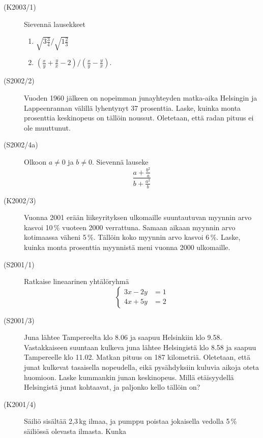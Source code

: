 \begin{description}
    \item[(K2003/1)]   Sievennä lausekkeet
        \begin{enumerate}
            \item $ \sqrt{3\frac{3}{4}} \big/ \sqrt{1\frac{2}{3}} $
            \item $ \left( \frac{x}{y} + \frac{y}{x} - 2 \right) \big/ \left( \frac{x}{y} - \frac{y}{x} \right) $.
        \end{enumerate}        
    \item[(S2002/2)]   Vuoden 1960 jälkeen on nopeimman junayhteyden matka-aika Helsingin ja Lappeenrannan välillä lyhentynyt
                       37 prosenttia. Laske, kuinka monta prosenttia keskinopeus on tällöin noussut. Oletetaan, että radan pituus ei
                       ole muuttunut.
    \item[(S2002/4a)]  Olkoon $ a \neq 0$ ja $b \neq 0 $. Sievennä lauseke
                       \[
                           \frac{a + \frac{b^2}{a} } {b + \frac{a^2}{b} }
                       \]
    \item[(K2002/3)]   Vuonna 2001 erään liikeyrityksen ulkomaille suuntautuvan myynnin arvo kasvoi 10\,\% vuoteen
                       2000 verrattuna. Samaan aikaan myynnin arvo kotimaassa väheni 5\,\%. Tällöin koko myynnin arvo kasvoi 6\,\%.
                       Laske, kuinka monta prosenttia myynnistä meni vuonna 2000 ulkomaille.
    \item[(S2001/1)]   Ratkaise lineaarinen yhtälöryhmä
                       \[
                         \left\{
                          \begin{matrix}
                             3x - 2y &= 1 \\
                             4x + 5y &= 2                      
                         \end{matrix}
                         \right.
                       \]
    \item[(S2001/3)]   Juna lähtee Tampereelta klo 8.06 ja saapuu Helsinkiin klo 9.58. Vastakkaiseen suuntaan kulkeva juna lähtee
                       Helsingistä klo 8.58 ja saapuu Tampereelle klo 11.02. Matkan pituus on 187 kilometriä. Oletetaan, että junat 
                       kulkevat tasaisella nopeudella, eikä pysähdyksiin kuluvia aikoja oteta huomioon. Laske kummankin junan 
                       keskinopeus. Millä etäisyydellä Helsingistä junat kohtaavat, ja paljonko kello tällöin on? 
    \item[(K2001/4)]   Säiliö sisältää 2,3\,kg ilmaa, ja pumppu poistaa jokaisella vedolla 5\,\% säiliössä olevasta ilmasta. Kunka

\end{description}
